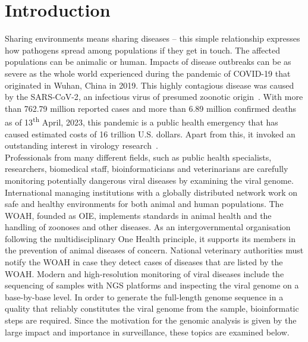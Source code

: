 \chapter{Introduction}\label{chap:introduction}
Sharing environments means sharing diseases -- this simple relationship expresses how pathogens spread among populations if they get in touch. The affected populations can be animalic or human. Impacts of disease outbreaks can be as severe as the whole world experienced during the pandemic of \ac{COVID-19} that originated in Wuhan, China in 2019. This highly contagious disease was caused by the \ac{SARS-CoV-2}, an infectious virus of presumed zoonotic origin~\cite{wu2020new}. With more than 762.79 million reported cases and more than 6.89 million confirmed deaths as of 13\textsuperscript{th} April, 2023, this pandemic is a public health emergency that has caused estimated costs of 16 trillion U.S. dollars. Apart from this, it invoked an outstanding interest in virology research~\cite{covid}. \\
Professionals from many different fields, such as public health specialists, researchers, biomedical staff, bioinformaticians and veterinarians are carefully monitoring potentially dangerous viral diseases by examining the viral genome. International managing institutions with a globally distributed network work on safe and healthy environments for both animal and human populations. The \ac{WOAH}, founded as \ac{OIE}, implements standards in animal health and the handling of zoonoses and other diseases. As an intergovernmental organisation following the multidisciplinary One Health principle, it supports its members in the prevention of animal diseases of concern. National veterinary authorities must notify the \ac{WOAH} in case they detect cases of diseases that are listed by the \ac{WOAH}. Modern and high-resolution monitoring of viral diseases include the sequencing of samples with \ac{NGS} platforms and inspecting the viral genome on a base-by-base level. In order to generate the full-length genome sequence in a quality that reliably constitutes the viral genome from the sample, bioinformatic steps are required. Since the motivation for the genomic analysis is given by the large impact and importance in surveillance, these topics are examined below.

